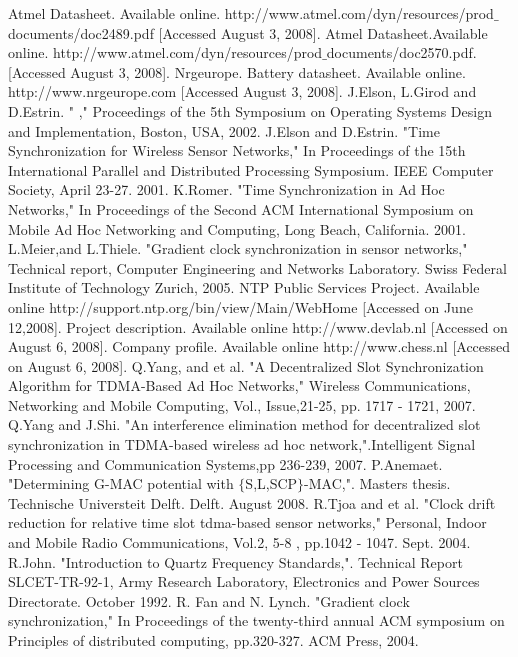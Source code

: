 \documentclass[a4paper,10pt]{report}
\begin{document}
\begin{thebibliography}{\textbf{References}}
Atmel Datasheet. Available online. http:\slash \slash www.atmel.com\slash dyn\slash resources\slash prod$\_$documents\slash doc2489.pdf [Accessed August 3, 2008].
Atmel Datasheet.Available online. http:\slash \slash www.atmel.com\slash dyn\slash resources\slash prod$\_$documents\slash doc2570.pdf. [Accessed August 3, 2008].
Nrgeurope. Battery datasheet. Available online. http:\slash \slash www.nrgeurope.com [Accessed August 3, 2008].
J.Elson, L.Girod and D.Estrin. "
," Proceedings of the 5th Symposium on Operating Systems Design and Implementation, Boston, USA, 2002.
J.Elson and D.Estrin. "Time Synchronization for Wireless Sensor Networks," In Proceedings of the 15th International Parallel and Distributed Processing Symposium. IEEE Computer Society, April 23-27. 2001.
K.Romer. "Time Synchronization in Ad Hoc Networks," In Proceedings of the Second ACM International Symposium on Mobile Ad Hoc Networking and Computing, Long Beach, California. 2001.
L.Meier,and L.Thiele. "Gradient clock synchronization in sensor networks," Technical report, Computer Engineering and Networks Laboratory. Swiss Federal Institute of Technology Zurich, 2005.
NTP Public Services Project. Available online http:\slash \slash support.ntp.org\slash bin\slash view\slash Main\slash WebHome [Accessed on June 12,2008].
Project description. Available online http://www.devlab.nl [Accessed on August 6, 2008].
Company profile. Available online http://www.chess.nl [Accessed on August 6, 2008].
Q.Yang, and et al. "A Decentralized Slot Synchronization Algorithm for TDMA-Based Ad Hoc Networks," Wireless Communications, Networking and Mobile Computing, Vol., Issue,21-25, pp. 1717 - 1721, 2007.
Q.Yang and J.Shi. "An interference elimination method for decentralized slot synchronization in TDMA-based wireless ad hoc network,".Intelligent Signal Processing and Communication Systems,pp 236-239, 2007.
P.Anemaet. "Determining G-MAC potential with $\{$S,L,SCP$\}$-MAC,". Masters thesis. Technische Universteit Delft. Delft. August 2008.
R.Tjoa and et al. "Clock drift reduction for relative time slot tdma-based sensor networks," Personal, Indoor and Mobile Radio Communications, Vol.2, 5-8 , pp.1042 - 1047. Sept. 2004.
R.John. "Introduction to Quartz Frequency Standards,". Technical Report SLCET-TR-92-1, Army Research Laboratory, Electronics and Power Sources Directorate. October 1992.
R. Fan and N. Lynch. "Gradient clock synchronization," In Proceedings of the twenty-third annual ACM symposium on Principles of distributed computing, pp.320-327. ACM Press, 2004.

\end{thebibliography}
\end{document}
